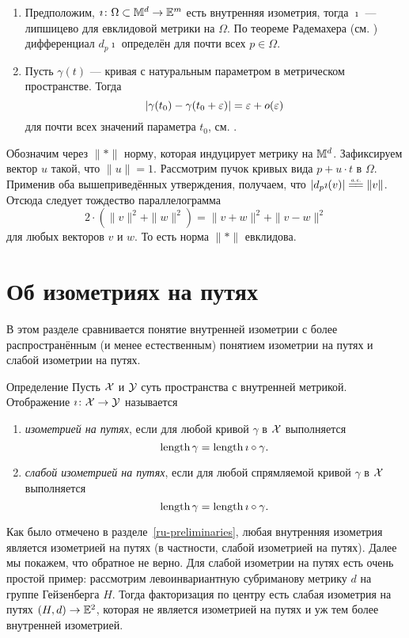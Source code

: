 \documentclass[oneside,a4paper]{article}
\begin{document}
\begin{enumerate}
\item Предположим, $\imath\colon\Omega\subset\mathbb{M}^d \to\mathbb{E}^m$ есть внутренняя изометрия, 
тогда $\imath$ --- липшицево для евклидовой метрики на $\Omega$.
По теореме Радемахера (см. \cite[3.1.6]{ref-to-df}) дифференциал $d_p\imath$ определён для почти всех $p\in \Omega$.
\item Пусть $\gamma(t)$ --- кривая с натуральным параметром в метрическом пространстве.
Тогда 
$$|\gamma({t_0})-\gamma({t_0+\varepsilon})|=\varepsilon+o(\varepsilon) $$
для почти всех значений параметра $t_0$,
см.  \cite[2.7.5]{BBI}.
\end{enumerate}
Обозначим через $\|{*}\|$ норму, которая индуцирует метрику на $\mathbb{M}^d$.
Зафиксируем вектор $u$ такой, что $\|u\|=1$.
Рассмотрим пучок кривых вида $p+u\cdot t$ в $\Omega$.
Применив оба вышеприведённых утверждения, получаем,
что $|d_p\imath(v)|\z\ae\|{v}\|$.
Отсюда следует тождество параллелограмма
$$2\cdot\left(\|v\|^2+\|w\|^2\right)=\|v+w\|^2+\|v-w\|^2$$
для любых векторов $v$ и $w$.
То есть норма $\|{*}\|$ евклидова.
\qeds









\section{Об изометриях на путях}\label{ru-path.isometry}

В этом разделе сравнивается понятие внутренней изометрии с более распространённым (и менее естественным) понятием изометрии на путях и слабой изометрии на путях.

\begin{thm}{Определение}\label{ru-def:path-iso}
Пусть $\mathcal{X}$ и $\mathcal{Y}$ суть пространства с внутренней метрикой.
Отображение $\imath\colon \mathcal{X}\to \mathcal{Y}$ называется 
\begin{enumerate}
\item\emph{изометрией на путях}, если для любой кривой $\gamma$ в $\mathcal{X}$ выполняется 
$$\mathop{\rm length}\nolimits \gamma=\mathop{\rm length}\nolimits \imath\circ\gamma.$$
\item\emph{слабой изометрией на путях}, если для любой спрямляемой кривой $\gamma$ в $\mathcal{X}$ выполняется
$$\mathop{\rm length}\nolimits \gamma=\mathop{\rm length}\nolimits \imath\circ\gamma.$$
\end{enumerate}
\end{thm}

Как было отмечено в разделе~\ref{ru-preliminaries}, любая внутренняя изометрия является изометрией на путях 
(в частности, слабой изометрией на путях).
Далее мы покажем, что обратное не верно.
Для слабой изометрии на путях есть очень простой пример:
рассмотрим левоинвариантную субриманову метрику $d$ на группе Гейзенберга $H$.
Тогда факторизация по центру есть слабая изометрия на путях $(H,d)\to\mathbb{E}^2$, которая не является изометрией на путях и уж тем более  внутренней изометрией.
\end{document}

